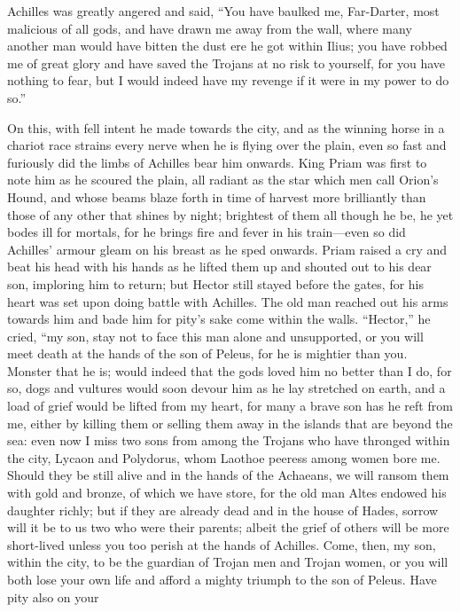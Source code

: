 Achilles was greatly angered and said, “You have baulked me, Far-Darter,
most malicious of all gods, and have drawn me away from the wall, where
many another man would have bitten the dust ere he got within Ilius; you
have robbed me of great glory and have saved the Trojans at no risk to
yourself, for you have nothing to fear, but I would indeed have my revenge
if it were in my power to do so.”

On this, with fell intent he made towards the city, and as the winning
horse in a chariot race strains every nerve when he is flying over the
plain, even so fast and furiously did the limbs of Achilles bear him
onwards. King Priam was first to note him as he scoured the plain, all
radiant as the star which men call Orion’s Hound, and whose beams blaze
forth in time of harvest more brilliantly than those of any other that
shines by night; brightest of them all though he be, he yet bodes ill for
mortals, for he brings fire and fever in his train—even so did
Achilles’ armour gleam on his breast as he sped onwards. Priam raised a
cry and beat his head with his hands as he lifted them up and shouted out
to his dear son, imploring him to return; but Hector still stayed before
the gates, for his heart was set upon doing battle with Achilles. The old
man reached out his arms towards him and bade him for pity’s sake come
within the walls. “Hector,” he cried, “my son, stay not to face this man
alone and unsupported, or you will meet death at the hands of the son of
Peleus, for he is mightier than you. Monster that he is; would indeed that
the gods loved him no better than I do, for so, dogs and vultures would
soon devour him as he lay stretched on earth, and a load of grief would be
lifted from my heart, for many a brave son has he reft from me, either by
killing them or selling them away in the islands that are beyond the sea:
even now I miss two sons from among the Trojans who have thronged within
the city, Lycaon and Polydorus, whom Laothoe peeress among women bore me.
Should they be still alive and in the hands of the Achaeans, we will
ransom them with gold and bronze, of which we have store, for the old man
Altes endowed his daughter richly; but if they are already dead and in the
house of Hades, sorrow will it be to us two who were their parents; albeit
the grief of others will be more short-lived unless you too perish at the
hands of Achilles. Come, then, my son, within the city, to be the guardian
of Trojan men and Trojan women, or you will both lose your own life and
afford a mighty triumph to the son of Peleus. Have pity also on your
